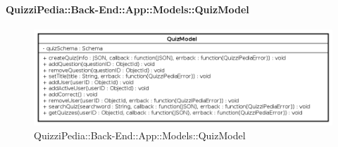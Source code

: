 \paragraph{QuizziPedia::Back-End::App::Models::QuizModel}
\label{QuizziPedia::Back-End::App::Models::QuizModel}
\begin{figure}[ht]
	\centering
	\includegraphics[scale=0.45]{UML/Classi/Back-End/QuizziPedia_Back-End_App_Models_quizModel.png}
	\caption{QuizziPedia::Back-End::App::Models::QuizModel}
\end{figure}
\FloatBarrier



